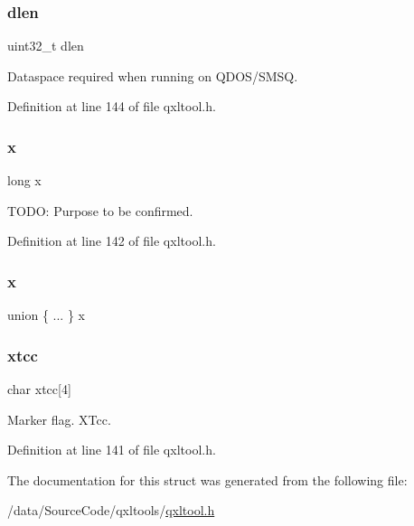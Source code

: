 \subsubsection{\texorpdfstring{dlen}{dlen}}
{\footnotesize\ttfamily uint32\+\_\+t dlen}

Dataspace required when running on Q\+D\+O\+S/\+S\+M\+SQ. 

Definition at line 144 of file qxltool.\+h.

\mbox{\label{struct_x_t_c_c_a3162ada50d1df39e0f0555ea3d60dea1}} 
\subsubsection{\texorpdfstring{x}{x}\hspace{0.1cm}{\footnotesize\ttfamily [1/2]}}
{\footnotesize\ttfamily long x}

T\+O\+DO\+: Purpose to be confirmed. 

Definition at line 142 of file qxltool.\+h.

\mbox{\label{struct_x_t_c_c_ac3cd33d0da064be57dbfdfe529905ff2}} 
\subsubsection{\texorpdfstring{x}{x}\hspace{0.1cm}{\footnotesize\ttfamily [2/2]}}
{\footnotesize\ttfamily union \{ ... \}   x}

\mbox{\label{struct_x_t_c_c_acd9081c4e246dfc8ecf272a9ccb10624}} 
\subsubsection{\texorpdfstring{xtcc}{xtcc}}
{\footnotesize\ttfamily char xtcc\mbox{[}4\mbox{]}}

Marker flag. \textquotesingle{}X\+Tcc\textquotesingle{}. 

Definition at line 141 of file qxltool.\+h.



The documentation for this struct was generated from the following file\+:\begin{DoxyCompactItemize}
\item 
/data/\+Source\+Code/qxltools/\hyperlink{qxltool_8h}{qxltool.\+h}\end{DoxyCompactItemize}
